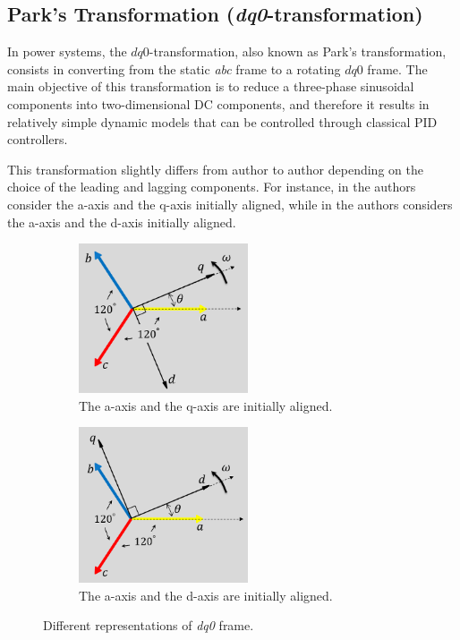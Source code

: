 \subsection{Park's Transformation (\textit{dq0}-transformation)}

In power systems, the $dq0$-transformation, also known as Park's transformation,
consists in converting from the static \textit{abc} frame to a rotating $dq0$
frame. The main objective of this transformation is to reduce a three-phase
sinusoidal components into two-dimensional DC components, and therefore it
results in relatively simple dynamic models that can be controlled through
classical PID controllers.

This transformation slightly differs from author to author depending on the
choice of the leading and lagging components. For instance, in
\cite{sauer2017power} the authors consider the a-axis and the q-axis initially
aligned, while in \cite{krause2002analysis} the authors considers the a-axis and
the d-axis initially aligned.

\begin{figure}[!ht]
    \centering
    \begin{subfigure}{.5\textwidth}
      \centering
      \includegraphics[width=5cm]{images/park_transform_axes_01.png}
      \caption{The a-axis and the q-axis are initially aligned.}
      \label{fig:park_transform_axes_01}
    \end{subfigure}%
    \begin{subfigure}{.5\textwidth}
      \centering
      \includegraphics[width=5cm]{images/park_transform_axes_02.png}
      \caption{The a-axis and the d-axis are initially aligned.}
      \label{fig:park_transform_axes_2}
    \end{subfigure}
    \caption{Different representations of \textit{dq0} frame.}
    \label{fig:park_transform_axes}
\end{figure}

